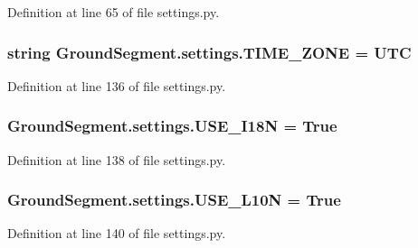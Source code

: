 Definition at line 65 of file settings.\+py.

\hypertarget{namespace_ground_segment_1_1settings_a7f5b157199222270cc12a900b1dbb6cc}{}
\subsubsection[{T\+I\+M\+E\+\_\+\+Z\+O\+N\+E}]{\setlength{\rightskip}{0pt plus 5cm}string Ground\+Segment.\+settings.\+T\+I\+M\+E\+\_\+\+Z\+O\+N\+E = \textquotesingle{}U\+T\+C\textquotesingle{}}\label{namespace_ground_segment_1_1settings_a7f5b157199222270cc12a900b1dbb6cc}


Definition at line 136 of file settings.\+py.

\hypertarget{namespace_ground_segment_1_1settings_a58a4a6948688cc8ccf2f31d6bea3a954}{}
\subsubsection[{U\+S\+E\+\_\+\+I18\+N}]{\setlength{\rightskip}{0pt plus 5cm}Ground\+Segment.\+settings.\+U\+S\+E\+\_\+\+I18\+N = True}\label{namespace_ground_segment_1_1settings_a58a4a6948688cc8ccf2f31d6bea3a954}


Definition at line 138 of file settings.\+py.

\hypertarget{namespace_ground_segment_1_1settings_a8cf0ce46819ba284c86a1e87267378af}{}
\subsubsection[{U\+S\+E\+\_\+\+L10\+N}]{\setlength{\rightskip}{0pt plus 5cm}Ground\+Segment.\+settings.\+U\+S\+E\+\_\+\+L10\+N = True}\label{namespace_ground_segment_1_1settings_a8cf0ce46819ba284c86a1e87267378af}


Definition at line 140 of file settings.\+py.

